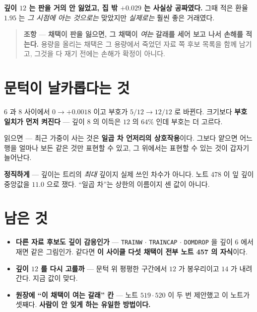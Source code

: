 \documentclass[11pt]{article}
\begin{document}
\textbf{깊이 $12$ 는 판을 거의 안 잃었고, 집 밖 $+0.029$ 는 사실상
공짜였다.} 그때 적은 환율 $1.95$ 는 \emph{그 시점에 아는 것으로는} 맞았지만
\emph{실제로는} 훨씬 좋은 거래였다.

\begin{quote}
\textbf{조항} --- \textbf{채택이 판을 잃으면, 그 채택이 \emph{여는} 갈래를
세어 보고 나서 손해를 적는다.} 용량을 올리는 채택은 그 용량에서 죽었던
자료 쪽 후보 목록을 함께 남기고, 그것을 다 재기 전에는 손해가 확정이 아니다.
\end{quote}

\section{문턱이 날카롭다는 것}

$6$ 과 $8$ 사이에서 $0 \to +0.0018$ 이고 부호가 $5/12 \to 12/12$ 로
바뀐다. 크기보다 \textbf{부호 일치가 먼저 켜진다} --- 깊이 $8$ 의 이득은
$12$ 의 $64\%$ 인데 부호는 더 고르다.

읽으면 --- 최근 가중이 사는 것은 \textbf{일곱 차 언저리의 상호작용}이다.
그보다 얕으면 어느 행을 얼마나 보든 같은 것만 표현할 수 있고, 그 위에서는
표현할 수 있는 것이 갑자기 늘어난다.

\textbf{정직하게} --- 깊이는 트리의 \emph{최대} 깊이지 실제 쓰인 차수가
아니다. 노트 478 이 잎 깊이 중앙값을 $11.0$ 으로 쟀다. ``일곱 차''는
상한의 이름이지 센 값이 아니다.

\section*{남은 것}

\begin{itemize}
\item \textbf{다른 자료 후보도 깊이 감응인가} --- \texttt{TRAINW} $\cdot$
\texttt{TRAINCAP} $\cdot$ \texttt{DOMDROP} 을 깊이 $6$ 에서 재면 같은
그림인가. 같다면 \textbf{이 사이클 다섯 채택이 전부 노트 457 의 자식}이다.
\item \textbf{깊이 $12$ 를 다시 고를까} --- 문턱 위 평평한 구간에서 $12$ 가
봉우리이고 $14$ 가 내려간다. 지금 값이 맞다.
\item \textbf{원장에 ``이 채택이 여는 갈래'' 칸} --- 노트 $519 \cdot 520$
이 두 번 제안했고 이 노트가 셋째다. \textbf{사람이 안 잊게 하는 유일한
방법이다.}
\end{itemize}
\end{document}
